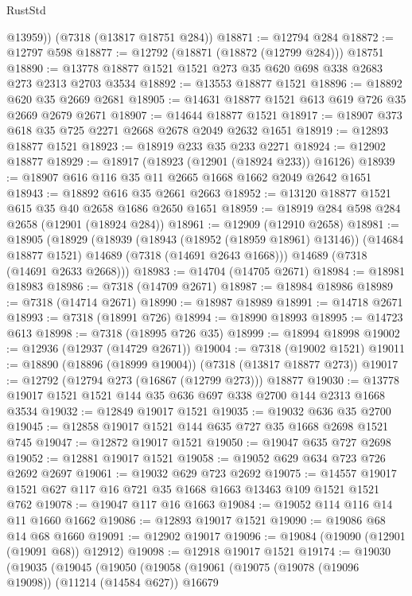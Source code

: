 \begin{lexlean}{RustStd}
\begin{coremodule}
        @13959))
    (@7318 (@13817 @18751 @284))
@18871 := @12794 @284
@18872 := @12797 @598
@18877 := @12792 (@18871 (@18872 (@12799 @284))) @18751
@18890 := @13778 @18877 @1521 @1521 @273 @35 @620 @698 @338 @2683 @273 @2313 @2703 @3534
@18892 := @13553 @18877 @1521
@18896 := @18892 @620 @35 @2669 @2681
@18905 := @14631 @18877 @1521 @613 @619 @726 @35 @2669 @2679 @2671
@18907 := @14644 @18877 @1521
@18917 := @18907 @373 @618 @35 @725 @2271 @2668 @2678 @2049 @2632 @1651
@18919 := @12893 @18877 @1521
@18923 := @18919 @233 @35 @233 @2271
@18924 := @12902 @18877
@18929 := @18917 (@18923 (@12901 (@18924 @233)) @16126)
@18939 := @18907 @616 @116 @35 @11 @2665 @1668 @1662 @2049 @2642 @1651
@18943 := @18892 @616 @35 @2661 @2663
@18952 := @13120 @18877 @1521 @615 @35 @40 @2658 @1686 @2650 @1651
@18959 := @18919 @284 @598 @284 @2658 (@12901 (@18924 @284))
@18961 := @12909 (@12910 @2658)
@18981 := @18905
    (@18929
      (@18939
        (@18943 (@18952 (@18959 @18961) @13146))
        (@14684 @18877 @1521)
        @14689
        (@7318 (@14691 @2643 @1668)))
      @14689
      (@7318 (@14691 @2633 @2668)))
@18983 := @14704 (@14705 @2671)
@18984 := @18981 @18983
@18986 := @7318 (@14709 @2671)
@18987 := @18984 @18986
@18989 := @7318 (@14714 @2671)
@18990 := @18987 @18989
@18991 := @14718 @2671
@18993 := @7318 (@18991 @726)
@18994 := @18990 @18993
@18995 := @14723 @613
@18998 := @7318 (@18995 @726 @35)
@18999 := @18994 @18998
@19002 := @12936 (@12937 (@14729 @2671))
@19004 := @7318 (@19002 @1521)
@19011 := @18890 (@18896 (@18999 @19004)) (@7318 (@13817 @18877 @273))
@19017 := @12792 (@12794 @273 (@16867 (@12799 @273))) @18877
@19030 := @13778 @19017 @1521 @1521 @144 @35 @636 @697 @338 @2700 @144 @2313 @1668 @3534
@19032 := @12849 @19017 @1521
@19035 := @19032 @636 @35 @2700
@19045 := @12858 @19017 @1521 @144 @635 @727 @35 @1668 @2698 @1521 @745
@19047 := @12872 @19017 @1521
@19050 := @19047 @635 @727 @2698
@19052 := @12881 @19017 @1521
@19058 := @19052 @629 @634 @723 @726 @2692 @2697
@19061 := @19032 @629 @723 @2692
@19075 := @14557 @19017 @1521 @627 @117 @16 @721 @35 @1668 @1663 @13463 @109 @1521 @1521 @762
@19078 := @19047 @117 @16 @1663
@19084 := @19052 @114 @116 @14 @11 @1660 @1662
@19086 := @12893 @19017 @1521
@19090 := @19086 @68 @14 @68 @1660
@19091 := @12902 @19017
@19096 := @19084 (@19090 (@12901 (@19091 @68)) @12912)
@19098 := @12918 @19017 @1521
@19174 := @19030
    (@19035
      (@19045
        (@19050
          (@19058
            (@19061
              (@19075
                (@19078 (@19096 @19098))
                (@11214 (@14584 @627))
                @16679

\end{coremodule}
\end{lexlean}
